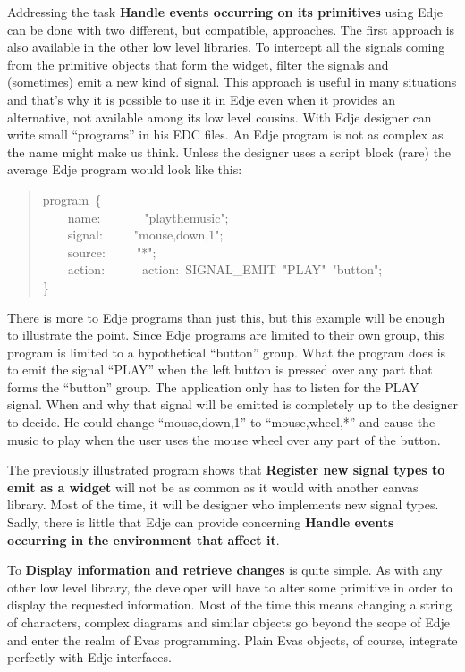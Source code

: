 \documentclass[12pt,a4paper,english]{book}
\begin{document}
Addressing the task \textbf{Handle events occurring on its primitives} using
Edje can be done with two different, but compatible, approaches. The first
approach is also available in the other low level libraries. To intercept all
the signals coming from the primitive objects that form the widget, filter the
signals and (sometimes) emit a new kind of signal. This approach is useful in
many situations and that's why it is possible to use it in Edje even when it
provides an alternative, not available among its low level cousins. With Edje
designer can write small ``programs'' in his EDC files. An Edje program is
not as complex as the name might make us think. Unless the designer uses a
script block (rare) the average Edje program would look like this:
\begin{quote}{\ttfamily \raggedright \noindent
program~{\{}~\\
~~~~name:~~~~~~~"playthemusic";~\\
~~~~signal:~~~~~"mouse,down,1";~\\
~~~~source:~~~~~"*";~\\
~~~~action:~~~~~~action:~SIGNAL{\_}EMIT~"PLAY"~"button";~\\
{\}}
}\end{quote}

There is more to Edje programs than just this, but this example will be enough
to illustrate the point. Since Edje programs are limited to their own group,
this program is limited to a hypothetical ``button'' group. What the program does
is to emit the signal ``PLAY'' when the left button is pressed over any part that
forms the ``button'' group. The application only has to listen for the PLAY
signal. When and why that signal will be emitted is completely up to the
designer to decide. He could change ``mouse,down,1'' to ``mouse,wheel,*'' and cause
the music to play when the user uses the mouse wheel over any part of the
button.

The previously illustrated program shows that \textbf{Register new signal types to
emit as a widget} will not be as common as it would with another canvas
library. Most of the time, it will be designer who implements new signal types.
Sadly, there is little that Edje can provide concerning \textbf{Handle events
occurring in the environment that affect it}.

To \textbf{Display information and retrieve changes} is quite simple. As with any
other low level library, the developer will have to alter some primitive in
order to display the requested information. Most of the time this means
changing a string of characters, complex diagrams and similar objects go
beyond the scope of Edje and enter the realm of Evas programming. Plain Evas
objects, of course, integrate perfectly with Edje interfaces.
\end{document}
